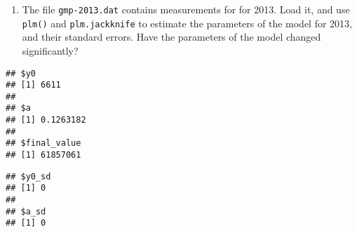 \documentclass[
]{article}
\newenvironment{Shaded}{\begin{snugshade}}{\end{snugshade}}
\newcommand{\DataTypeTok}[1]{\textcolor[rgb]{0.13,0.29,0.53}{#1}}
\newcommand{\DecValTok}[1]{\textcolor[rgb]{0.00,0.00,0.81}{#1}}
\newcommand{\FloatTok}[1]{\textcolor[rgb]{0.00,0.00,0.81}{#1}}
\newcommand{\KeywordTok}[1]{\textcolor[rgb]{0.13,0.29,0.53}{\textbf{#1}}}
\newcommand{\NormalTok}[1]{#1}
\newcommand{\OperatorTok}[1]{\textcolor[rgb]{0.81,0.36,0.00}{\textbf{#1}}}
\newcommand{\StringTok}[1]{\textcolor[rgb]{0.31,0.60,0.02}{#1}}
\providecommand{\tightlist}{%
  \setlength{\itemsep}{0pt}\setlength{\parskip}{0pt}}
\begin{document}
\begin{enumerate}
\def\labelenumi{\arabic{enumi}.}
\setcounter{enumi}{6}
\tightlist
\item
  The file \texttt{gmp-2013.dat} contains measurements for for 2013.
  Load it, and use \texttt{plm()} and \texttt{plm.jackknife} to estimate
  the parameters of the model for 2013, and their standard errors. Have
  the parameters of the model changed significantly?
\end{enumerate}

\begin{Shaded}
\end{Shaded}

\begin{verbatim}
## $y0
## [1] 6611
## 
## $a
## [1] 0.1263182
## 
## $final_value
## [1] 61857061
\end{verbatim}

\begin{Shaded}
\end{Shaded}

\begin{verbatim}
## $y0_sd
## [1] 0
## 
## $a_sd
## [1] 0
\end{verbatim}
\end{document}

